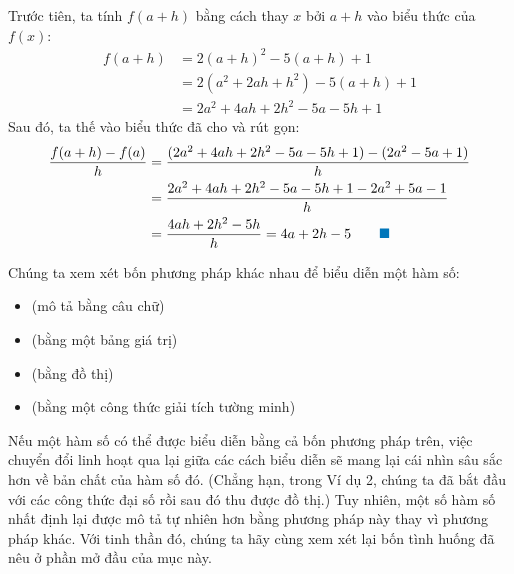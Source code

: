 \begin{minipage}[t]{0.705\textwidth}
    \vspace{3pt}
    \quad Trước tiên, ta tính $f(a + h)$ bằng cách thay $x$ bởi $a + h$ vào biểu thức của $f(x)$:
    \begin{align*}
    f(a + h) &= 2(a + h)^2 - 5(a + h) + 1 \\
    &= 2(a^2 + 2ah + h^2) - 5(a + h) + 1 \\
    &= 2a^2 + 4ah + 2h^2 - 5a - 5h + 1
    \end{align*}
    Sau đó, ta thế vào biểu thức đã cho và rút gọn:
    \begin{align*}
    \frac{f(a + h) - f(a)}{h} &= \frac{(2a^2 + 4ah + 2h^2 - 5a - 5h + 1) - (2a^2 - 5a + 1)}{h} \\
    &= \frac{2a^2 + 4ah + 2h^2 - 5a - 5h + 1 - 2a^2 + 5a - 1}{h} \\
    &= \frac{4ah + 2h^2 - 5h}{h} = 4a + 2h - 5 \qquad {\color{stewartcyan}\blacksquare}
    \end{align*}

    \vspace{4pt}
    \vspace{3pt}

    Chúng ta xem xét bốn phương pháp khác nhau để biểu diễn một hàm số:
    \begin{itemize}[itemsep=1pt, topsep=2pt, leftmargin=1.5em]
        \item[{\color{stewartred}\textbullet}]  (mô tả bằng câu chữ)
        \item[{\color{stewartred}\textbullet}]  (bằng một bảng giá trị)
        \item[{\color{stewartred}\textbullet}]  (bằng đồ thị)
        \item[{\color{stewartred}\textbullet}]  (bằng một công thức giải tích tường minh)
    \end{itemize}
    \vspace{2pt}

    Nếu một hàm số có thể được biểu diễn bằng cả bốn phương pháp trên, việc chuyển đổi linh hoạt qua lại giữa các cách biểu diễn sẽ mang lại cái nhìn sâu sắc hơn về bản chất của hàm số đó. (Chẳng hạn, trong Ví dụ 2, chúng ta đã bắt đầu với các công thức đại số rồi sau đó thu được đồ thị.) Tuy nhiên, một số hàm số nhất định lại được mô tả tự nhiên hơn bằng phương pháp này thay vì phương pháp khác. Với tinh thần đó, chúng ta hãy cùng xem xét lại bốn tình huống đã nêu ở phần mở đầu của mục này.
\end{minipage}